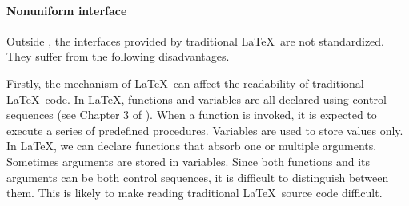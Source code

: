 \documentclass{ltugboat}
\begin{document}
\paragraph{Nonuniform interface} 

Outside \liii, the interfaces provided by traditional \LaTeX~are not standardized. They suffer from the following disadvantages.


Firstly, the mechanism of \LaTeX~can affect the readability of traditional \LaTeX~code. 
In \LaTeX, functions and variables are all declared using control sequences (see Chapter 3 of \cite{knuth1984texbook}).
When a function is invoked, it is expected to execute a series of predefined procedures. Variables are used to store values only.
In \LaTeX, we can declare functions that absorb one or multiple arguments.
Sometimes arguments are stored in variables.
Since both functions and its arguments can be both control sequences, it is difficult to distinguish between them. 
This is likely to make reading traditional \LaTeX\ source code difficult.

\end{document}
